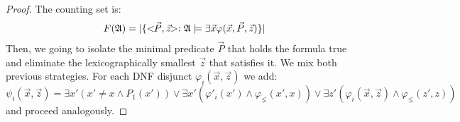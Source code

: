 \documentclass[12pt]{article}
\def\A{{\frak A}}
\begin{document}
\begin{proof}
\item The counting set is:
$$
F(\A) = \vert \{ <\!\!\vec{P},\vec{z}\!\!> :\A \models \exists \vec{x} \varphi(\vec{x}, \vec{P},\vec{z}) \} \vert
$$
Then, we going to isolate the minimal predicate $\vec{P}$ that holds the formula true and eliminate the lexicographically smallest $\vec{z}$ that satisfies it. We mix both previous strategies. For each DNF disjunct $\varphi_i(\vec{x}, \vec{z})$ we add:
$$
\psi_i(\vec{x}, \vec{z}) = \exists x' (x' \neq x \wedge P_1(x')) \vee \exists x' (\varphi'_i(x') \wedge \varphi_{\lneq}(x',x)) \vee \exists z'(\varphi_i(\vec{x}, \vec{z}) \wedge \varphi_{\lneq}(z',z))
$$
and proceed analogously.
\end{proof}
\end{document}
